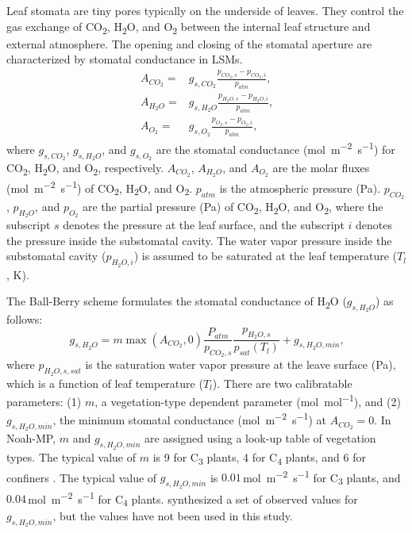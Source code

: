 \documentclass[essd]{copernicus}
\begin{document}
Leaf stomata are tiny pores typically on the underside of leaves. They control
the gas exchange of CO\textsubscript{2}, H\textsubscript{2}O, and
O\textsubscript{2} between the internal leaf structure and external atmosphere.
The opening and closing of the stomatal aperture are characterized by stomatal
conductance in LSMs.
\begin{align}
  A_{CO_2} = & g_{s,CO_2} \frac{p_{CO_2,s} - p_{CO_2,i}}{p_{atm}} \text{,} \\
  A_{H_2O} = & g_{s,H_2O} \frac{p_{H_2O,s} - p_{H_2O,i}}{p_{atm}} \text{,} \\
  A_{O_2} =  & g_{s,O_2} \frac{p_{O_2,s} - p_{O_2,i}}{p_{atm}} \text{,}
\end{align}
where \(g_{s,CO_2}\), \(g_{s,H_2O}\), and \(g_{s,O_2}\) are the stomatal
conductance (\si{mol~m^{-2}~s^{-1}}) for CO\textsubscript{2},
H\textsubscript{2}O, and O\textsubscript{2}, respectively. \(A_{CO_2}\),
\(A_{H_2O}\), and \(A_{O_2}\) are the molar fluxes (\si{mol~m^{-2}~s^{-1}}) of
CO\textsubscript{2}, H\textsubscript{2}O, and O\textsubscript{2}. \(p_{atm}\) is
the atmospheric pressure (\si{Pa}). \(p_{CO_2}\), \(p_{H_2O}\), and \(p_{O_2}\)
are the partial pressure (\si{Pa}) of CO\textsubscript{2}, H\textsubscript{2}O,
and O\textsubscript{2}, where the subscript \(s\) denotes the pressure at the
leaf surface, and the subscript \(i\) denotes the pressure inside the
substomatal cavity. The water vapor pressure inside the substomatal cavity
(\(p_{H_2O,i}\)) is assumed to be saturated at the leaf temperature (\(T_l\),
\si{K}).

The Ball-Berry scheme \citep{ball1987PiPR, collatz1991AFM, collatz1992FPB}
formulates the stomatal conductance of H\textsubscript{2}O (\(g_{s,H_2O}\)) as
follows:
\begin{equation}
  g_{s,H_2O} = m \max(A_{CO_2},0) \frac{P_{atm}}{p_{CO_2,s}}\frac{p_{H_2O,s}}{p_{sat}(T_l)} + g_{s,H_2O,min} \text{,}
\end{equation}
where \(p_{H_2O,s,sat}\) is the saturation water vapor pressure at the leave
surface (\si{Pa}), which is a function of leaf temperature (\(T_l\)). There are
two calibratable parameters: (1) \(m\), a vegetation-type dependent parameter
(\si{mol~mol^{-1}}), and (2) \(g_{s,H_2O,min}\), the minimum stomatal
conductance (\si{mol~m^{-2}~s^{-1}}) at \(A_{CO_2} = 0\). In Noah-MP, \(m\) and
\(g_{s,H_2O,min}\) are assigned using a look-up table of vegetation types. The
typical value of \(m\) is 9 for C\textsubscript{3} plants, 4 for
C\textsubscript{4} plants, and 6 for confiners \citep{sellers1996JC}. The
typical value of \(g_{s,H_2O,min}\) is \(0.01\)\,\si{mol~m^{-2}~s^{-1}} for
C\textsubscript{3} plants, and \(0.04\)\,\si{mol~m^{-2}~s^{-1}} for
C\textsubscript{4} plants. \citet{Lombardozzi2017GMD} synthesized a set of
observed values for \(g_{s,H_2O,min}\), but the values have not been used in
this study.
\end{document}

